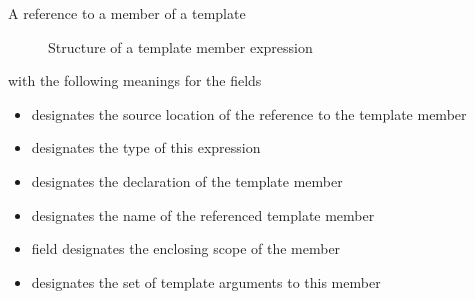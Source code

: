A reference to a member of a template
%
\begin{figure}[H]
	\centering
	\caption{Structure of a template member expression}
	\label{fig:ifc-member-template-expression-structure}
\end{figure}
%
with the following meanings for the fields
\begin{itemize}
	\item {} designates the source location of the reference to the template member
	\item {} designates the type of this expression
	\item {} designates the declaration of the template member
	\item {} designates the name of the referenced template member
	\item {} field designates the enclosing scope of the member
	\item {} designates the set of template arguments to this member
\end{itemize}




\subsection{}
\label{sec:ifc:ExprSort:Statement}

